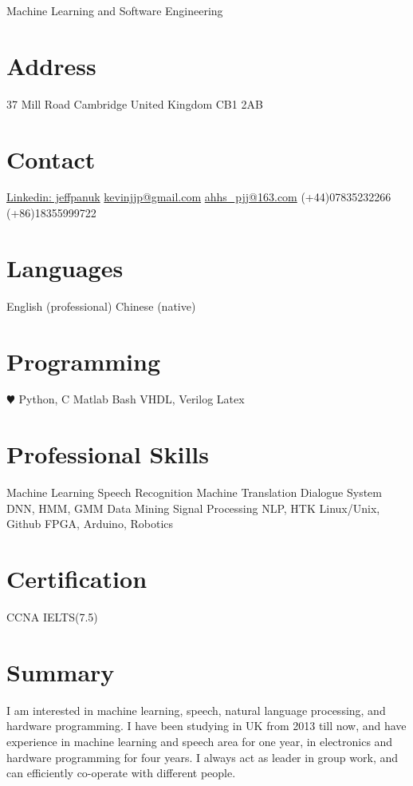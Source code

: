 \documentclass[]{friggeri-cv}
\begin{document}
       {Machine Learning and Software Engineering}


\begin{aside}
  \section{Address}
    37 Mill Road
    Cambridge
    United Kingdom
    CB1 2AB
    ~
  \section{Contact}
  	\href{https:uk.linkedin.com/in/jeffpanuk}{Linkedin: jeffpanuk}
   \href{mailto:kevinjjp@gmail.com}{kevinjjp@gmail.com}
      \href{mailto:ahhs_pjj@163.com}{ahhs\_pjj@163.com}
     (+44)07835232266
	  (+86)18355999722
	~
  \section{Languages}
    English (professional)
    Chinese (native)
    ~
  \section{Programming}
    {\color{red} $\varheartsuit$} Python, C
    Matlab
    Bash
    VHDL, Verilog
    Latex
    ~
  \section{Professional Skills}
	Machine Learning
	Speech Recognition
	Machine Translation
	Dialogue System
	DNN, HMM, GMM
	Data Mining
	Signal Processing
	NLP, HTK
  	Linux/Unix, Github
  	FPGA, Arduino, Robotics  
  	~
  \section{Certification}
  	CCNA
  	IELTS(7.5)	
\end{aside}

\section{Summary}

I am interested in machine learning, speech, natural language processing, and hardware programming. I have been studying in UK from 2013 till now, and have experience in machine learning and speech area for one year, in electronics and hardware programming for four years. I always act as leader in group work, and can efficiently co-operate with different people.
\end{document}
